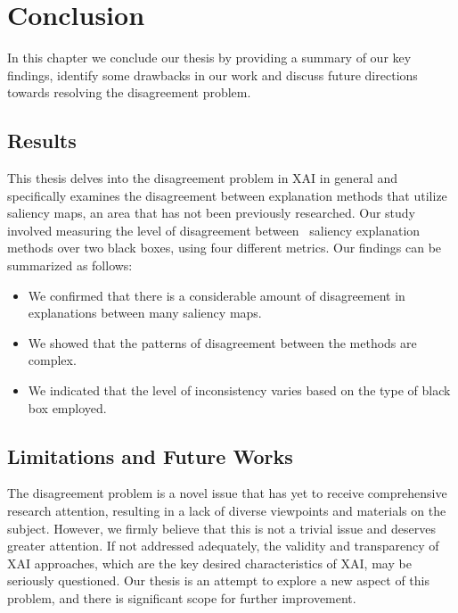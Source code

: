 \chapter{Conclusion}
\label{ch:conclusion}
In this chapter we conclude our thesis by providing a summary of our key findings, identify some drawbacks in our work and discuss future directions towards resolving the disagreement problem.

\section{Results}
This thesis delves into the disagreement problem in XAI in general and specifically examines the disagreement between explanation methods that utilize saliency maps, an area that has not been previously researched. Our study involved measuring the level of disagreement between \numExperimentedMethods\ saliency explanation methods over two black boxes, using four different metrics. Our findings can be summarized as follows:
\begin{itemize}
    \item We confirmed that there is a considerable amount of disagreement in explanations between many saliency maps.
    \item We showed that the patterns of disagreement between the methods are complex.
    \item We indicated that the level of inconsistency varies based on the type of black box employed.
\end{itemize}


\section{Limitations and Future Works}
\label{sec:futureWorks}
The disagreement problem is a novel issue that has yet to receive comprehensive research attention, resulting in a lack of diverse viewpoints and materials on the subject. However, we firmly believe that this is not a trivial issue and deserves greater attention. If not addressed adequately, the validity and transparency of XAI approaches, which are the key desired characteristics of XAI, may be seriously questioned. Our thesis is an attempt to explore a new aspect of this problem, and there is significant scope for further improvement.

